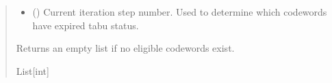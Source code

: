 \documentclass[letterpaper,10pt,english]{sphinxmanual}
\begin{document}
\begin{fulllineitems}
\begin{quote}
\begin{description}
\begin{itemize}
\item {} 
\sphinxAtStartPar
{} () \textendash{} Current iteration step number. Used to determine
which codewords have expired tabu status.

\end{itemize}

\sphinxAtStartPar
\begin{description}
\sphinxAtStartPar
Returns an empty list if no eligible codewords exist.

\end{description}


\sphinxAtStartPar
List{[}int{]}

\end{description}\end{quote}

\end{fulllineitems}

\end{document}
